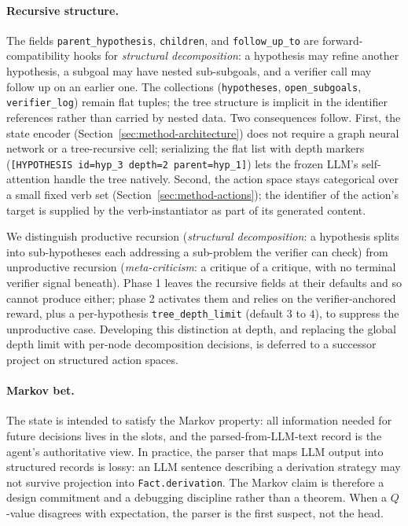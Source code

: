 \paragraph{Recursive structure.}
The fields \texttt{parent\_hypothesis}, \texttt{children}, and
\texttt{follow\_up\_to} are forward-compatibility hooks for
\emph{structural decomposition}: a hypothesis may refine another
hypothesis, a subgoal may have nested sub-subgoals, and a verifier call may
follow up on an earlier one. The collections (\texttt{hypotheses},
\texttt{open\_subgoals}, \texttt{verifier\_log}) remain flat tuples; the
tree structure is implicit in the identifier references rather than
carried by nested data. Two consequences follow. First, the state encoder
(Section~\ref{sec:method-architecture}) does not require a graph neural
network or a tree-recursive cell; serializing the flat list with depth
markers (\texttt{[HYPOTHESIS id=hyp\_3 depth=2 parent=hyp\_1]}) lets the
frozen LLM's self-attention handle the tree natively. Second, the action
space stays categorical over a small fixed verb set
(Section~\ref{sec:method-actions}); the identifier of the action's target
is supplied by the verb-instantiator as part of its generated content.

We distinguish productive recursion (\emph{structural decomposition}: a
hypothesis splits into sub-hypotheses each addressing a sub-problem the
verifier can check) from unproductive recursion (\emph{meta-criticism}: a
critique of a critique, with no terminal verifier signal beneath). Phase 1
leaves the recursive fields at their defaults and so cannot produce
either; phase 2 activates them and relies on the verifier-anchored reward,
plus a per-hypothesis \texttt{tree\_depth\_limit} (default $3$ to $4$), to
suppress the unproductive case. Developing this distinction at depth,
and replacing the global depth limit with per-node decomposition
decisions, is deferred to a successor project on structured action
spaces.

\paragraph{Markov bet.}
The state is intended to satisfy the Markov property: all information
needed for future decisions lives in the slots, and the
parsed-from-LLM-text record is the agent's authoritative view. In
practice, the parser that maps LLM output into structured records is
lossy: an LLM sentence describing a derivation strategy may not survive
projection into \texttt{Fact.derivation}. The Markov claim is therefore a
design commitment and a debugging discipline rather than a theorem. When
a $Q$-value disagrees with expectation, the parser is the first suspect,
not the head.

